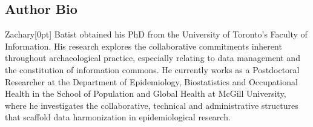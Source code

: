 \documentclass[
]{article}
\newcommand{\paragraphnumber}[1]{\marginnote{\color{lightgray}\tiny{#1}}[0pt]}
\begin{document}
\subsection{Author Bio}\label{author-bio}

Zachary\paragraphnumber{[79]} Batist obtained his PhD from the
University of Toronto's Faculty of Information. His research explores
the collaborative commitments inherent throughout archaeological
practice, especially relating to data management and the constitution of
information commons. He currently works as a Postdoctoral Researcher at
the Department of Epidemiology, Biostatistics and Occupational Health in
the School of Population and Global Health at McGill University, where
he investigates the collaborative, technical and administrative
structures that scaffold data harmonization in epidemiological research.
\end{document}
